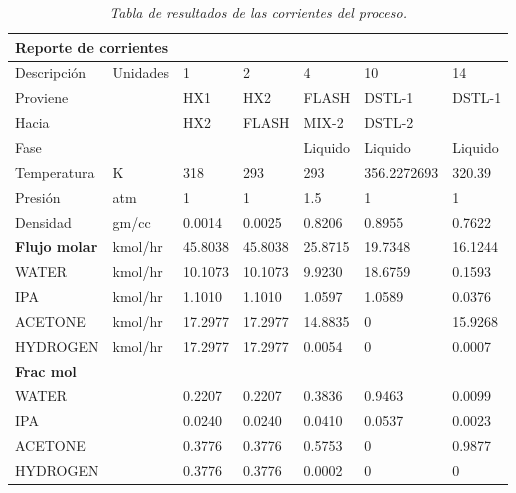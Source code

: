\begin{table}[H]
    \centering
    \caption{\textit{Tabla de resultados de las corrientes del proceso.}}
    \label{Tabla resultados}
    \begin{tabular}{lllllll}
    \hline
    \multicolumn{7}{l}{Reporte de corrientes}                                               \\
    \hline
    Descripción    & Unidades   & 1          & 2         & 4         & 10          & 14        \\
    \hline
    Proviene           &         & HX1        & HX2       & FLASH     & DSTL-1      & DSTL-1    \\
    Hacia             &         & HX2        & FLASH     & MIX-2     & DSTL-2      &           \\
    Fase          &         &            &           & Liquido    & Liquido      & Liquido    \\
    Temperatura    & K       & 318        & 293       & 293       & 356.2272693 & 320.39    \\
    Presión       & atm     & 1          & 1         & 1.5       & 1           & 1         \\
    Densidad    & gm/cc   & 0.0014     & 0.0025    & 0.8206    & 0.8955      & 0.7622    \\
    \textbf{Flujo molar}     & kmol/hr & 45.8038    & 45.8038   & 25.8715   & 19.7348     & 16.1244   \\
    WATER          & kmol/hr & 10.1073    & 10.1073   & 9.9230    & 18.6759     & 0.1593    \\
    IPA            & kmol/hr & 1.1010     & 1.1010    & 1.0597    & 1.0589      & 0.0376    \\
    ACETONE        & kmol/hr & 17.2977    & 17.2977   & 14.8835   & 0           & 15.9268   \\
    HYDROGEN       & kmol/hr & 17.2977    & 17.2977   & 0.0054    & 0           & 0.0007    \\
    \textbf{Frac mol} &         &            &           &           &             &           \\
    WATER          &         & 0.2207     & 0.2207    & 0.3836    & 0.9463      & 0.0099    \\
    IPA            &         & 0.0240     & 0.0240    & 0.0410    & 0.0537      & 0.0023    \\
    ACETONE        &         & 0.3776     & 0.3776    & 0.5753    & 0           & 0.9877    \\
    HYDROGEN       &         & 0.3776     & 0.3776    & 0.0002    & 0           & 0         \\

\end{tabular}
\end{table}
